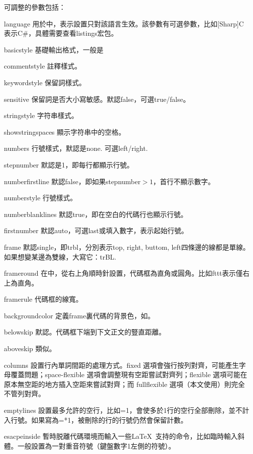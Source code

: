 可調整的參數包括：
\begin{para}
\item[language] 用於中，表示設置只對該語言生效。該參數有可選參數，比如[Sharp]C表示C\#，具體需要查看listings宏包。
\item[basicstyle] 基礎輸出格式，一般是
\item[commentstyle] 註釋樣式。
\item[keywordstyle] 保留詞樣式。
\item[sensitive] 保留詞是否大小寫敏感。默認false，可選true/false。
\item[stringstyle] 字符串樣式。
\item[showstringspaces] 顯示字符串中的空格。
\item[numbers] 行號樣式，默認是none. 可選left/right.
\item[stepnumber] 默認是1，即每行都顯示行號。
\item[numberfirstline] 默認false，即如果stepnumber$>1$，首行不顯示數字。
\item[numberstyle] 行號樣式。
\item[numberblanklines] 默認true，即在空白的代碼行也顯示行號。
\item[firstnumber] 默認auto，可選last或填入數字，表示起始行號。
\item[frame] 默認single，即trbl，分別表示top, right, buttom, left四條邊的線都是單線。如果想變某邊為雙線，大寫它：trBL.
\item[frameround] 在中，從右上角順時針設置，代碼框為直角或圓角。比如fttt表示僅右上為直角。
\item[framerule] 代碼框的線寬。
\item[backgroundcolor] 定義frame裏代碼的背景色，如。
\item[belowskip] 默認。代碼框下端到下文正文的豎直距離。
\item[aboveskip] 類似。
\item[columns] 設置行內單詞間距的處理方式。fixed 選項會強行按列對齊，可能產生字母覆蓋問題；space-flexible 選項會調整現有空距嘗試對齊列；flexible 選項可能在原本無空距的地方插入空距來嘗試對齊；而 fullflexible 選項（本文使用）則完全不管列對齊。
\item[emptylines] 設置最多允許的空行，比如=1，會使多於1行的空行全部刪除，並不計入行號。如果寫為=*1，被刪除的行的行號仍然會保留計數。
\item[esacpeinside] 暫時脱離代碼環境而輸入一些\LaTeX\ 支持的命令，比如臨時輸入斜體。一般設置為一對重音符號（鍵盤數字1左側的符號）。
\end{para}

